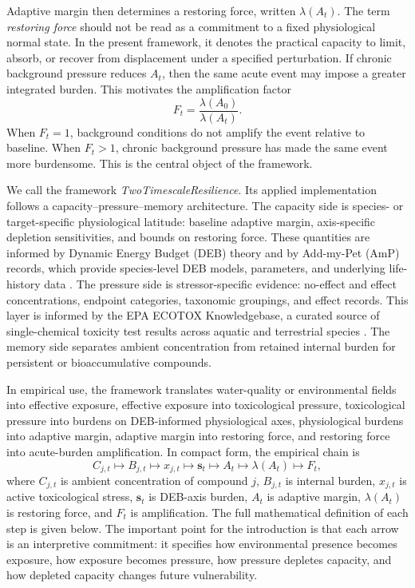 Adaptive margin then determines a restoring force, written $\lambda(A_t)$. The term \emph{restoring force} should not be read as a commitment to a fixed physiological normal state. In the present framework, it denotes the practical capacity to limit, absorb, or recover from displacement under a specified perturbation. If chronic background pressure reduces $A_t$, then the same acute event may impose a greater integrated burden. This motivates the amplification factor
\begin{equation}
  F_t = \frac{\lambda(A_0)}{\lambda(A_t)}.
  \label{eq:intro_amplification}
\end{equation}
When $F_t=1$, background conditions do not amplify the event relative to baseline. When $F_t>1$, chronic background pressure has made the same event more burdensome. This is the central object of the framework.

We call the framework \emph{TwoTimescaleResilience}. Its applied implementation follows a capacity--pressure--memory architecture. The capacity side is species- or target-specific physiological latitude: baseline adaptive margin, axis-specific depletion sensitivities, and bounds on restoring force. These quantities are informed by Dynamic Energy Budget (DEB) theory and by Add-my-Pet (AmP) records, which provide species-level DEB models, parameters, and underlying life-history data \citep{kooijman2010deb,marques2018amp}. The pressure side is stressor-specific evidence: no-effect and effect concentrations, endpoint categories, taxonomic groupings, and effect records. This layer is informed by the EPA ECOTOX Knowledgebase, a curated source of single-chemical toxicity test results across aquatic and terrestrial species \citep{olker2022ecotox}. The memory side separates ambient concentration from retained internal burden for persistent or bioaccumulative compounds.

In empirical use, the framework translates water-quality or environmental fields into effective exposure, effective exposure into toxicological pressure, toxicological pressure into burdens on DEB-informed physiological axes, physiological burdens into adaptive margin, adaptive margin into restoring force, and restoring force into acute-burden amplification. In compact form, the empirical chain is
\begin{equation}
  C_{j,t}\mapsto B_{j,t}\mapsto x_{j,t}\mapsto \mathbf{s}_{t}
  \mapsto A_t\mapsto\lambda(A_t)\mapsto F_t,
  \label{eq:intro_empirical_chain}
\end{equation}
where $C_{j,t}$ is ambient concentration of compound $j$, $B_{j,t}$ is internal burden, $x_{j,t}$ is active toxicological stress, $\mathbf{s}_t$ is DEB-axis burden, $A_t$ is adaptive margin, $\lambda(A_t)$ is restoring force, and $F_t$ is amplification. The full mathematical definition of each step is given below. The important point for the introduction is that each arrow is an interpretive commitment: it specifies how environmental presence becomes exposure, how exposure becomes pressure, how pressure depletes capacity, and how depleted capacity changes future vulnerability.


